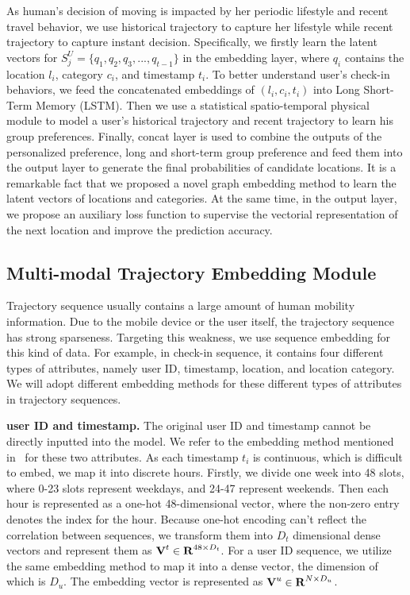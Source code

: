 \documentclass[10pt,journal,compsoc]{IEEEtran}
\begin{document}
As human's decision of moving is impacted by her periodic lifestyle and recent travel behavior, we use historical trajectory to capture her lifestyle while recent trajectory to capture instant decision. Specifically, we firstly learn the latent vectors for $S_j^{U}=\{q_1,q_2,q_3,...,q_{t-1}\}$ in the embedding layer, where $q_i$ contains the location $l_i$, category $c_i$, and timestamp $t_i$. To better understand user’s check-in behaviors, we feed the concatenated embeddings of $(l_i,c_i,t_i)$ into Long Short-Term Memory (LSTM). Then we use a statistical spatio-temporal physical module to model a user's historical trajectory and recent trajectory to learn his group preferences. Finally, concat layer is used to combine the outputs of the personalized preference, long and short-term group preference and feed them into the output layer to generate the final probabilities of candidate locations. It is a remarkable fact that we proposed a novel graph embedding method to learn the latent vectors of locations and categories. At the same time, in the output layer, we propose an auxiliary loss function to supervise the vectorial representation of the next location and improve the prediction accuracy.

\subsection{Multi-modal Trajectory Embedding Module}
Trajectory sequence usually contains a large amount of human mobility information. Due to the mobile device or the user itself, the trajectory sequence has strong sparseness. Targeting this weakness, we use sequence embedding for this kind of data. For example, in check-in sequence, it contains four different types of attributes, namely user ID, timestamp, location, and location category. We will adopt different embedding methods for these different types of attributes in trajectory sequences.

\textbf{user ID and timestamp.} The original user ID and timestamp cannot be directly inputted into the model. We refer to the embedding method mentioned in~\cite{feng2018deepmove,chen2020next} for these two attributes. As each timestamp $t_i$ is continuous, which is difficult to embed, we map it into discrete hours. Firstly, we divide one week into 48 slots, where 0-23 slots represent weekdays, and 24-47 represent weekends. Then each hour is represented as a one-hot 48-dimensional vector, where the non-zero entry denotes the index for the hour. Because one-hot encoding can’t reflect the correlation between sequences, we transform them into $D_t$ dimensional dense vectors and represent them as $\bm{{\rm V}}^t\in{\bm{{\rm R}}^{48\times{D_t}}}$. For a user ID sequence, we utilize the same embedding method to map it into a dense vector, the dimension of which is $D_u$. The embedding vector is represented as $\bm{{\rm V}}^u\in{\bm{{\rm R}}^{N\times{D_u}}}$.
\end{document}
